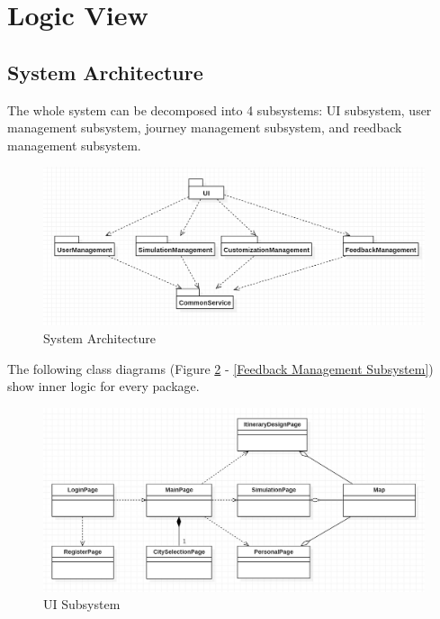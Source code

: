 \documentclass[10pt]{article}
\begin{document}
\section{Logic View}
\subsection{System Architecture}
The whole system can be decomposed into 4 subsystems: UI subsystem, user management subsystem, journey management subsystem, and reedback management subsystem.

\begin{figure}[H]
    \centering
    \includegraphics[width=14cm]{architecture.png}
    \caption{System Architecture}
    \label{System Architecture}
\end{figure}

The following class diagrams (Figure \ref{UI Subsystem} - \ref{Feedback Management Subsystem}) show inner logic for every package.

\begin{figure}[H]
    \centering
    
    \includegraphics[width=14cm]{ui.jpg}
    \caption{UI Subsystem}
    \label{UI Subsystem}
\end{figure}
\end{document}
